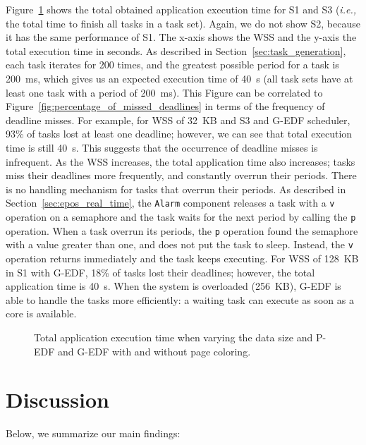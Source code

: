 \documentclass[10pt, conference, compsocconf]{IEEEtran}
\newcommand{\fig}[4][ht!]{
  \begin{figure}[#1]
    {\centering{\texttt{[image: fig/\#2]}}\par}
    \caption{#3}
    \label{fig:#2}
  \end{figure}
}
\begin{document}
Figure~\ref{fig:total_exec_time} shows the total obtained application execution time for S1 and S3 (\textit{i.e.,} the total time to finish all tasks in a task set). Again, we do not show S2, because it has the same performance of S1. The x-axis shows the WSS and the y-axis the total execution time in seconds. As described in Section~\ref{sec:task_generation}, each task iterates for 200 times, and the greatest possible period for a task is 200~\si{\milli\second}, which gives us an expected execution time of 40~\si{\second} (all task sets have at least one task with a period of 200~\si{\milli\second}). This Figure can be correlated to Figure~\ref{fig:percentage_of_missed_deadlines} in terms of the frequency of deadline misses. For example, for WSS of 32~KB and S3 and G-EDF scheduler, 93\% of tasks lost at least one deadline; however, we can see that total execution time is still 40~\si{\second}. This suggests that the occurrence of deadline misses is infrequent. As the WSS increases, the total application time also increases; tasks miss their deadlines more frequently, and constantly overrun their periods. There is no handling mechanism for tasks that overrun their periods. As described in Section~\ref{sec:epos_real_time}, the \texttt{Alarm} component releases a task with a \texttt{v} operation on a semaphore and the task waits for the next period by calling the \texttt{p} operation. When a task overrun its periods, the \texttt{p} operation found the semaphore with a value greater than one, and does not put the task to sleep. Instead, the \texttt{v} operation returns immediately and the task keeps executing. For WSS of 128~KB in S1 with G-EDF, 18\% of tasks lost their deadlines; however, the total application time is 40~\si{\second}. When the system is overloaded (256~KB), G-EDF is able to handle the tasks more efficiently: a waiting task can execute as soon as a core is available. 

\fig{total_exec_time}{Total application execution time when varying the data size and P-EDF and G-EDF with and without page coloring.}{scale=.37}

\section{Discussion}
\label{sec:disc}

Below, we summarize our main findings:
\end{document}
